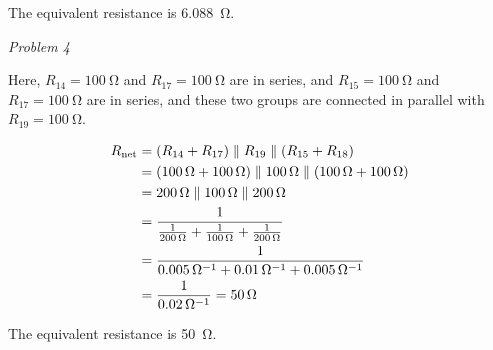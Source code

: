 \documentclass{article}
\begin{document}
The equivalent resistance is \SI{6.088}{\ohm}.

\pagebreak

\indent\textit{Problem 4}

Here, $R_{14} = \SI{100}{\ohm}$ and $R_{17} = \SI{100}{\ohm}$ are in series,
and $R_{15} = \SI{100}{\ohm}$ and $R_{17} = \SI{100}{\ohm}$ are in
series, and these two groups are connected in parallel with
$R_{19} = \SI{100}{\ohm}$.

\begin{align*}
    R_{\text{net}} &= (R_{14} + R_{17}) \parallel R_{19} \parallel (R_{15} + R_{18})\\
    &= (\SI{100}{\ohm} + \SI{100}{\ohm}) \parallel \SI{100}{\ohm} \parallel (\SI{100}{\ohm} + \SI{100}{\ohm})\\
    &= \SI{200}{\ohm} \parallel \SI{100}{\ohm} \parallel \SI{200}{\ohm}\\
    &= {1 \over \frac1{\SI{200}{\ohm}} + \frac1{\SI{100}{\ohm}} + \frac1{\SI{200}{\ohm}}}\\
    &= {1 \over \SI{0.005}{\per\ohm} + \SI{0.01}{\per\ohm} + \SI{0.005}{\per\ohm}}\\
    &= {1 \over \SI{0.02}{\per\ohm}} = \SI{50}{\ohm}
\end{align*}

The equivalent resistance is \SI{50}{\ohm}.
\end{document}
